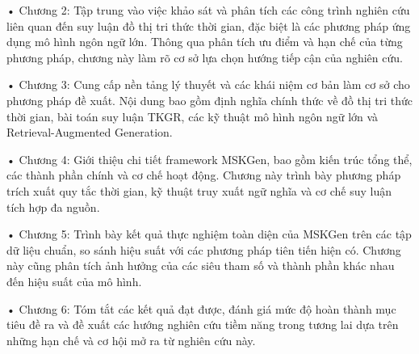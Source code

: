 • Chương 2: Tập trung vào việc khảo sát và phân tích các công trình nghiên cứu liên quan đến suy luận đồ thị tri thức thời gian, đặc biệt là các phương pháp ứng dụng mô hình ngôn ngữ lớn. Thông qua phân tích ưu điểm và hạn chế của từng phương pháp, chương này làm rõ cơ sở lựa chọn hướng tiếp cận của nghiên cứu.

• Chương 3: Cung cấp nền tảng lý thuyết và các khái niệm cơ bản làm cơ sở cho phương pháp đề xuất. Nội dung bao gồm định nghĩa chính thức về đồ thị tri thức thời gian, bài toán suy luận TKGR, các kỹ thuật mô hình ngôn ngữ lớn và Retrieval-Augmented Generation.

• Chương 4: Giới thiệu chi tiết framework MSKGen, bao gồm kiến trúc tổng thể, các thành phần chính và cơ chế hoạt động. Chương này trình bày phương pháp trích xuất quy tắc thời gian, kỹ thuật truy xuất ngữ nghĩa và cơ chế suy luận tích hợp đa nguồn.

• Chương 5: Trình bày kết quả thực nghiệm toàn diện của MSKGen trên các tập dữ liệu chuẩn, so sánh hiệu suất với các phương pháp tiên tiến hiện có. Chương này cũng phân tích ảnh hưởng của các siêu tham số và thành phần khác nhau đến hiệu suất của mô hình.

• Chương 6: Tóm tắt các kết quả đạt được, đánh giá mức độ hoàn thành mục tiêu đề ra và đề xuất các hướng nghiên cứu tiềm năng trong tương lai dựa trên những hạn chế và cơ hội mở ra từ nghiên cứu này.
